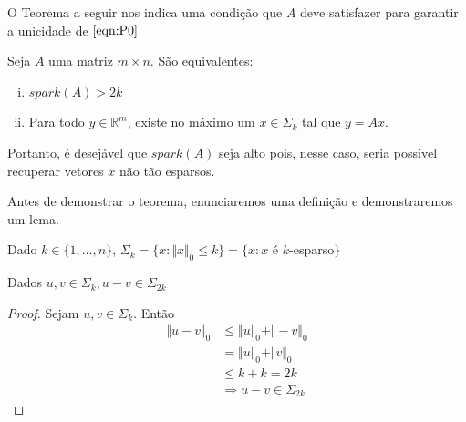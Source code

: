 O Teorema a seguir nos indica uma condição que $A$ deve satisfazer para garantir a unicidade de $\eqref{eqn:P0}$

\begin{teorema}
\label{thm:unicidade_P0}
Seja $A$ uma matriz $m \times n$. São equivalentes:

\begin{enumerate}[(i)]
\item $\textit{spark}(A)> 2k$

\item Para todo $y \in \mathbb{R}^m$, existe no máximo um $x \in \Sigma_k$ tal que $y = Ax$.
\end{enumerate}
\end{teorema}

Portanto, é desejável que $\textit{spark}(A)$ seja alto pois, nesse caso, seria possível recuperar vetores $x$ não tão esparsos.

Antes de demonstrar o teorema, enunciaremos uma definição e demonstraremos um lema.

\begin{definicao}
Dado $k \in \lbrace 1, \hdots , n \rbrace$,
$ \Sigma_k = \lbrace x : \Vert x \Vert_{0} \leq k \rbrace
           = \lbrace x : x $ é $k$-esparso$ \rbrace$
\end{definicao}

\begin{lema}
Dados $u, v \in \Sigma_k, u - v \in \Sigma_{2k}$
\end{lema}
\label{lem:sigma2k}
\begin{proof}
Sejam $u, v \in \Sigma_k$. Então
\begin{subequations}
\begin{align*}
\Vert u - v \Vert_0 & \leq \Vert u \Vert_0 + \Vert -v \Vert_0 \\
& = \Vert u \Vert_0 + \Vert v \Vert_0 \\
& \leq k + k = 2k \\
& \Rightarrow u - v \in \Sigma_{2k}
\end{align*}
\end{subequations}
\end{proof}

